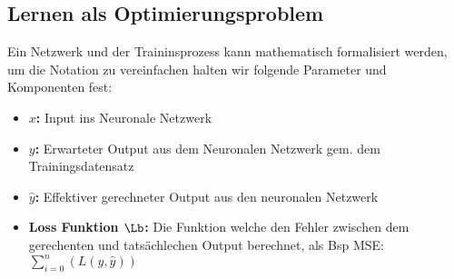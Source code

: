 \subsection{Lernen als Optimierungsproblem}
Ein Netzwerk und der Traininsprozess kann mathematisch formalisiert werden, um die Notation zu vereinfachen halten wir folgende Parameter und Komponenten fest:
\begin{itemize}
	\item{\textbf{$x$:} Input ins Neuronale Netzwerk}
	\item{\textbf{$y$:} Erwarteter Output aus dem Neuronalen Netzwerk gem. dem Trainingsdatensatz}
	\item{\textbf{$\hat{y}$:} Effektiver gerechneter Output aus den neuronalen Netzwerk}
	\item{\textbf{Loss Funktion $\Lb$:}  Die Funktion welche den Fehler zwischen dem gerechenten und tatsächlechen Output berechnet, als Bsp MSE: $\sum_{i=0}^{n}\left( L(y,\hat{y}) \right)$ }
\end{itemize}
